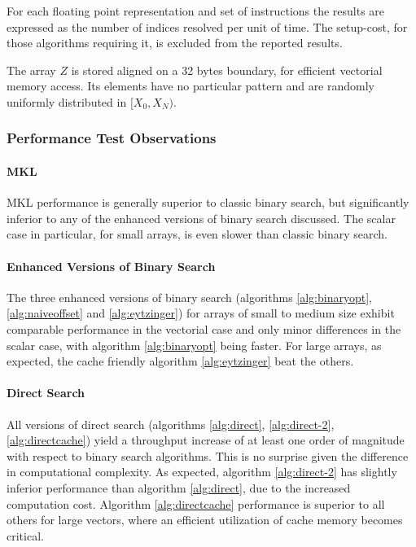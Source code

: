 \documentclass[preprint,1p,times]{elsarticle}
\begin{document}
For each floating point representation and set of instructions the results are expressed as the number of indices resolved per unit of time. The setup-cost, for those algorithms requiring it, is excluded from the reported results. 

The array $Z$ is stored aligned on a 32 bytes boundary, for efficient vectorial memory access. Its elements have no particular pattern and are randomly uniformly distributed in $[X_0,X_N)$.

\subsubsection{Performance Test Observations}

\paragraph{MKL}
MKL performance is generally superior to classic binary search, but significantly inferior to any of the enhanced versions of binary search discussed. The scalar case in particular, for small arrays, is even slower than classic binary search.

\paragraph{Enhanced Versions of Binary Search}
The three enhanced versions of binary search (algorithms \ref{alg:binaryopt}, \ref{alg:naiveoffset} and \ref{alg:eytzinger}) for arrays of small to medium size exhibit comparable performance in the vectorial case and only minor differences in the scalar case, with algorithm \ref{alg:binaryopt} being faster. For large arrays, as expected, the cache friendly algorithm \ref{alg:eytzinger} beat the others. 

\paragraph{Direct Search}
All versions of direct search (algorithms \ref{alg:direct}, \ref{alg:direct-2}, \ref{alg:directcache}) yield a throughput increase of at least one order of magnitude with respect to binary search algorithms. This is no surprise given the difference in computational complexity. As expected, algorithm \ref{alg:direct-2} has slightly inferior performance than algorithm \ref{alg:direct}, due to the increased computation cost. Algorithm \ref{alg:directcache} performance is superior to all others for large vectors, where an efficient utilization of cache memory becomes critical.
\end{document}
